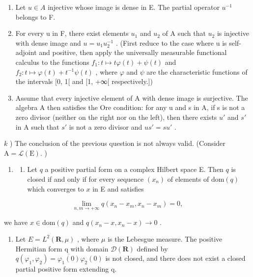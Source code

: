 \begin{enumerate}
\def\labelenumi{\alph{enumi})}
\setcounter{enumi}{7}
\item
  Let \(u \in A\) injective whose image is dense in E. The partial operator \(u^{-1}\) belongs to F.
\item
  For every u in F, there exist elements \(u_{1}\) and \(u_{2}\) of A such that \(u_{2}\) is injective with dense image and \(u = u_{1}u_{2}^{-1}\) . (First reduce to the case where u is self-adjoint and positive, then apply the universally measurable functional calculus to the functions \(f_{1}: t \mapsto t\varphi(t) + \psi(t)\) and \(f_{2}: t \mapsto \varphi(t) + t^{-1}\psi(t)\) , where \(\varphi\) and \(\psi\) are the characteristic functions of the intervals {[}0, 1{[} and {[}1, +∞{[} respectively.{]})
\item
  Assume that every injective element of A with dense image is surjective. The algebra A then satisfies the Ore condition: for any u and s in A, if s is not a zero divisor (neither on the right nor on the left), then there exists \(u'\) and \(s'\) in A such that \(s'\) is not a zero divisor and \(us' = su'\) .
\end{enumerate}

\(k\) ) The conclusion of the previous question is not always valid. (Consider \(\mathrm{A} = \mathcal{L}(\mathrm{E}).\) )

\begin{enumerate}
\def\labelenumi{\arabic{enumi})}
\setcounter{enumi}{10}
\tightlist
\item
  \begin{enumerate}
  \def\labelenumii{\alph{enumii})}
  \tightlist
  \item
    Let \(q\) a positive partial form on a complex Hilbert space E. Then \(q\) is closed if and only if for every sequence \((x_{n})\) of elements of \(\text{dom}(q)\) which converges to \(x\) in E and satisfies
  \end{enumerate}
\end{enumerate}

\[
\lim _ {n, m \to + \infty} q (x _ {n} - x _ {m}, x _ {n} - x _ {m}) = 0,
\]

we have \(x \in \text{dom}(q)\) and \(q(x_{n} - x, x_{n} - x) \to 0\) .

\begin{enumerate}
\def\labelenumi{\alph{enumi})}
\setcounter{enumi}{1}
\tightlist
\item
  Let \(E = L^{2}(\mathbf{R}, \mu)\) , where \(\mu\) is the Lebesgue measure. The positive Hermitian form q with domain \(\mathcal{D}(\mathbf{R})\) defined by \(q(\varphi_{1}, \varphi_{2}) = \overline{\varphi_{1}(0)}\varphi_{2}(0)\) is not closed, and there does not exist a closed partial positive form extending q.
\end{enumerate}

